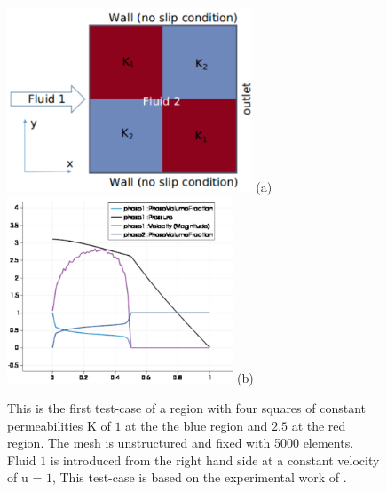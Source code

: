 \begin{figure}[ht]
\vbox{
\hbox{\includegraphics[width=0.65\textwidth]{./Pics/2b2_P1DGP2}}
\vspace{-0.cm}
\hbox{\hspace{5cm}(a)}
\vspace{-0.cm}
\hbox{\includegraphics[width=0.6\textwidth]{./Pics/2b2_P1DGP2_plot}}
\vspace{-0.cm}
\hbox{\hspace{5cm}(b)}
}\caption{This is the first test-case of a region with four squares of constant permeabilities K of $1$ at the the blue region and $2.5$ at the red region. The mesh is unstructured and fixed with 5000 elements. Fluid $1$ is introduced from the right hand side at a constant velocity of u = $1$, This test-case is based on the experimental work of \citet{evans_1994}.}\label{fig:square}
\end{figure}

 


